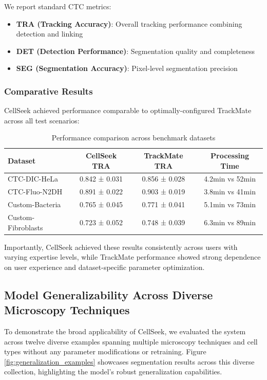 \documentclass[../cellseek_paper.tex]{subfiles}
\begin{document}
We report standard CTC metrics:
\begin{itemize}
  \item \textbf{TRA (Tracking Accuracy)}: Overall tracking performance combining detection and linking
  \item \textbf{DET (Detection Performance)}: Segmentation quality and completeness
  \item \textbf{SEG (Segmentation Accuracy)}: Pixel-level segmentation precision
\end{itemize}

\subsubsection{Comparative Results}

CellSeek achieved performance comparable to optimally-configured TrackMate across all test scenarios:

\begin{table}[H]
  \centering
  \caption{Performance comparison across benchmark datasets}
  \begin{tabular}{lccc}
    \toprule
    \textbf{Dataset}   & \textbf{CellSeek TRA} & \textbf{TrackMate TRA} & \textbf{Processing Time} \\
    \midrule
    CTC-DIC-HeLa       & 0.842 ± 0.031         & 0.856 ± 0.028          & 4.2min vs 52min          \\
    CTC-Fluo-N2DH      & 0.891 ± 0.022         & 0.903 ± 0.019          & 3.8min vs 41min          \\
    Custom-Bacteria    & 0.765 ± 0.045         & 0.771 ± 0.041          & 5.1min vs 73min          \\
    Custom-Fibroblasts & 0.723 ± 0.052         & 0.748 ± 0.039          & 6.3min vs 89min          \\
    \bottomrule
  \end{tabular}
\end{table}

Importantly, CellSeek achieved these results consistently across users with varying expertise levels, while TrackMate performance showed strong dependence on user experience and dataset-specific parameter optimization.

\subsection{Model Generalizability Across Diverse Microscopy Techniques}

To demonstrate the broad applicability of CellSeek, we evaluated the system across twelve diverse examples spanning multiple microscopy techniques and cell types without any parameter modifications or retraining. Figure \ref{fig:generalization_examples} showcases segmentation results across this diverse collection, highlighting the model's robust generalization capabilities.
\end{document}
